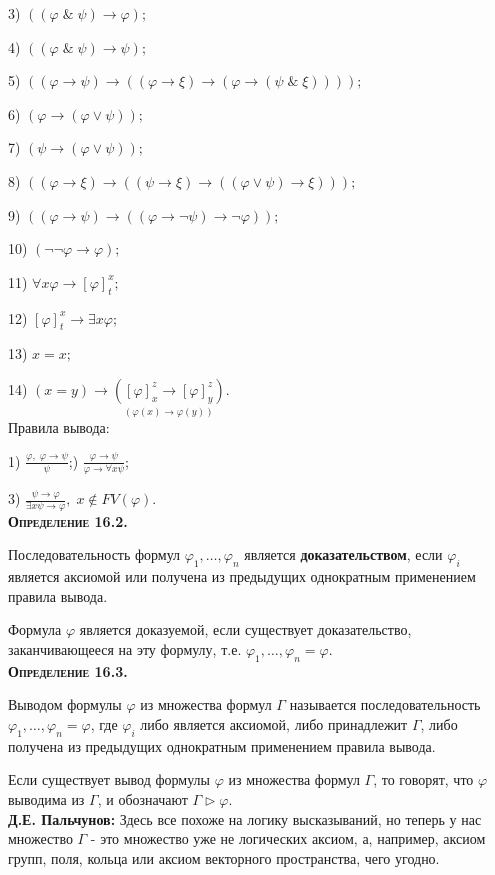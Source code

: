 \documentclass[18pt, a4paper]{extarticle}
\newcommand{\ampersand}{\;\&\;}
\newcommand{\Gm}{\Gamma}
\newcommand{\vp}{\varphi}
\begin{document}
3) $((\varphi\ampersand\psi)\to\varphi);$

4) $((\varphi\ampersand\psi)\to\psi);$

5) $((\varphi\to\psi)\to((\varphi\to\xi)\to(\varphi\to(\psi\ampersand\xi))));$

6) $(\varphi\to(\varphi\vee\psi));$

7) $(\psi\to(\varphi\vee\psi));$

8) $((\varphi\to\xi)\to((\psi\to\xi)\to((\varphi\vee\psi)\to\xi)));$

9) $((\varphi\to\psi)\to((\varphi\to\lnot\psi)\to\lnot\varphi));$

10) $(\lnot\lnot\varphi\to\varphi);$

11) $\forall x\vp\to[\vp]_t^x;$

12) $[\vp]_t^x\to\exists x\vp;$

13) $x=x;$

14) $(x=y)\to\underset{(\vp(x)\to\vp(y))}{([\vp]_x^z\to[\vp]_y^z)}$.\\

Правила вывода:

1) $\displaystyle \frac{\vp,\;\vp\to\psi}{\psi}$;) $\displaystyle \frac{\vp\to\psi}{\vp\to\forall x\psi}$;

3) $\displaystyle \frac{\psi\to\vp}{\exists x\psi\to\vp},\;x\notin FV(\vp)$.\\

\textbf{\textsc{Определение 16.2.}} 

Последовательность формул $\vp_1,\dots,\vp_n$ является \textbf{доказательством}, если $\vp_i$ является аксиомой или получена из предыдущих однократным применением правила вывода.

Формула $\vp$ является доказуемой, если существует доказательство, заканчивающееся на эту формулу, т.е. $\vp_1,\dots,\vp_n=\vp$.\\

\textbf{\textsc{Определение 16.3.}} 

Выводом формулы $\vp$ из множества формул $\Gm$ называется последовательность $\vp_1,\dots,\vp_n=\vp$, где $\vp_i$ либо является аксиомой, либо принадлежит $\Gm$, либо получена из предыдущих однократным применением правила вывода.

Если существует вывод формулы $\vp$ из множества формул $\Gm$, то говорят,
что $\vp$ выводима из $\Gm$, и обозначают $\Gm\rhd\vp$.\\

\textbf{Д.Е. Пальчунов:} Здесь все похоже на логику высказываний, но теперь у нас множество $\Gm$ - это множество уже не логических аксиом, а, например, аксиом групп, поля, кольца или аксиом векторного пространства, чего угодно. \\
\end{document}
